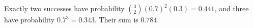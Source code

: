 Exactly two successes have probability $\binom32(0.7)^2(0.3)=0.441 $, and three have probability $ 0.7^3=0.343 $. Their sum is $\boxed{0.784}$.
